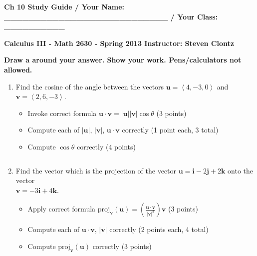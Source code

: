 \documentclass[12pt]{article}
\newcommand{\up}{$~$\vspace*{-0.7in}}
\newcommand{\liner}{\noindent\underline{\hspace*{7in}}}
\newcommand{\spac}{\hspace*{3em}}
\newcommand{\ds}{\displaystyle}
\renewcommand{\vec}{\mathbf}
\newcommand{\veci}{\vec{i}}
\newcommand{\vecj}{\vec{j}}
\newcommand{\veck}{\vec{k}}
\newcommand{\proj}{\mbox{proj}}
\newcommand{\<}{\left<}
\renewcommand{\>}{\right>}
\begin{document}
\up

{ \bf Ch 10 Study Guide / Your Name: \_\_\_\_\_\_\_\_\_\_\_\_\_\_\_\_\_\_\_\_\_\_\_\_\_\_\_ / Your Class: \_\_\_\_\_\_\_\_\_\_}

\vspace*{0.2in}

\centerline{ \bf Calculus III - Math 2630 - Spring 2013 \spac Instructor: Steven Clontz}

\vspace*{0.2in}

{\bf Draw a  around your answer. Show your work. Pens/calculators not allowed.}

\indent\liner


\begin{enumerate}

\item Find the cosine of the angle between the vectors $\vec{u}=\<4,-3,0\>$ and $\vec{v}=\<2,6,-3\>$.

  \begin{itemize}
\item Invoke correct formula $\vec{u}\cdot\vec{v} = |\vec{u}||\vec{v}|\cos \theta$ (3 points)
\item Compute each of $|\vec{u}|$, $|\vec{v}|$, $\vec{u}\cdot\vec{v}$ correctly (1 point each, 3 total)
\item Compute $\cos \theta$ correctly (4 points)
  \end{itemize}

\vspace*{6.5in}

\liner
\newpage\up

\item Find the vector which is the projection of the vector $\vec{u} = \veci-2\vecj+2\veck$ onto the vector \\$\vec{v}=-3\veci+4\veck$.

\begin{itemize}
\item Apply correct formula $\ds\proj_{\vec{v}}(\vec{u}) = \left(\frac{\vec{u}\cdot\vec{v}}{|\vec{v}|^2}\right)\vec{v}$ (3 points)
\item Compute each of $\vec{u}\cdot\vec{v}$, $|\vec{v}|$ correctly (2 points each, 4 total)
\item Compute $\proj_{\vec{v}}(\vec{u})$ correctly (3 points)
\end{itemize}

\vspace*{7in}


\end{enumerate}
\end{document}
